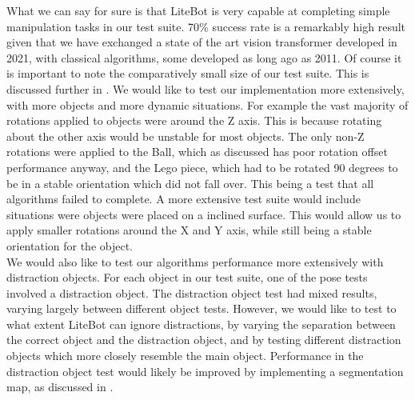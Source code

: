 What we can say for sure is that LiteBot is very capable at completing simple manipulation tasks in our test suite. 70\% success rate is a remarkably high result given that we have exchanged a state of the art vision transformer developed in 2021, with classical algorithms, some developed as long ago as 2011. Of course it is important to note the comparatively small size of our test suite. This is discussed further in . We would like to test our implementation more extensively, with more objects and more dynamic situations. For example the vast majority of rotations applied to objects were around the Z axis. This is because rotating about the other axis would be unstable for most objects. The only non-Z rotations were applied to the Ball, which as discussed has poor rotation offset performance anyway, and the Lego piece, which had to be rotated 90 degrees to be in a stable orientation which did not fall over. This being a test that all algorithms failed to complete. A more extensive test suite would include situations were objects were placed on a inclined surface. This would allow us to apply smaller rotations around the X and Y axis, while still being a stable orientation for the object.\\

We would also like to test our algorithms performance more extensively with distraction objects. For each object in our test suite, one of the pose tests involved a distraction object. The distraction object test had mixed results, varying largely between different object tests. However, we would like to test to what extent LiteBot can ignore distractions, by varying the separation between the correct object and the distraction object, and by testing different distraction objects which more closely resemble the main object. Performance in the distraction object test would likely be improved by implementing a segmentation map, as discussed in .

